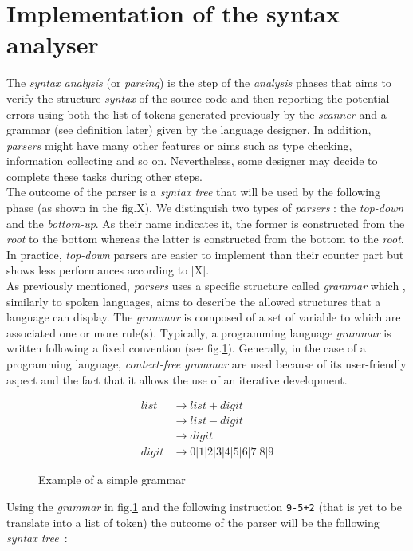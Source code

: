 \documentclass[a4paper,11pt]{article}
\begin{document}
\section{Implementation of the syntax analyser}
  The \textit{syntax analysis} (or \textit{parsing}) is the step of the \textit{analysis} phases that aims to verify the structure \textit{syntax} of the source code and then reporting the potential errors using both the list of tokens generated previously by the \textit{scanner} and a grammar (see definition later) given by the language designer. In addition, \textit{parsers} might have many other features or aims such as type checking, information collecting and so on. Nevertheless, some designer may decide to complete these tasks during other steps.\\
  The outcome of the parser is a \textit{syntax tree} that will be used by the following phase (as shown in the fig.X). We distinguish two types of \textit{parsers} : the \textit{top-down} and the \textit{bottom-up}. As their name indicates it, the former is constructed from the \textit{root} to the bottom whereas the latter is constructed from the bottom to the \textit{root}. In practice, \textit{top-down} parsers are easier to implement than their counter part but shows less performances according to [X].\\
  As previously mentioned, \textit{parsers} uses a specific structure called \textit{grammar} which , similarly to spoken languages, aims to describe the allowed structures that a language can display.%
  The \textit{grammar} is composed of a set of variable to which are associated one or more rule(s). Typically, a programming language \textit{grammar} is written following a fixed convention (see fig.\ref{example:grammar}). Generally, in the case of a programming language, \textit{context-free grammar} are used because of its user-friendly aspect and the fact that it allows the use of an iterative development.
  \begin{figure}[h!]
    \begin{align*}
      list  &\rightarrow list + digit \\
            &\rightarrow list - digit \\
            &\rightarrow digit \\
      digit &\rightarrow 0|1|2|3|4|5|6|7|8|9
    \end{align*}
    \caption{Example of a simple grammar}
    \label{example:grammar}
  \end{figure}
  Using the \textit{grammar} in fig.\ref{example:grammar} and the following instruction \verb|9-5+2| (that is yet to be translate into a list of token) the outcome of the parser will be the following \textit{syntax tree}~:
  
\end{document}
